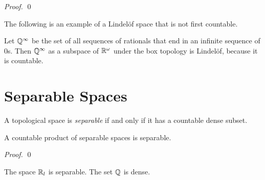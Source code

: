 \begin{proof}
    \pf
    \qed
\end{proof}

The following is an example of a Lindel\"{o}f space that is not first countable.
\begin{example}[Choice]
    Let $\mathbb{Q}^\infty$ be the set of all sequences of rationals that end in an
    infinite sequence of 0s. Then $\mathbb{Q}^\infty$ as a subspace of $\mathbb{R}^\omega$
    under the box topology is Lindel\"{o}f, because it is countable.
\end{example}

\section{Separable Spaces}

\begin{definition}[Separable]
    A topological space is \emph{separable} if and only if it has a countable dense
    subset.
\end{definition}

\begin{proposition}[AC]
    A countable product of separable spaces is separable.
\end{proposition}

\begin{proof}
    \pf
    \qed
\end{proof}

\begin{example}
    The space $\mathbb{R}_l$ is separable. The set $\mathbb{Q}$ is dense.
\end{example}

